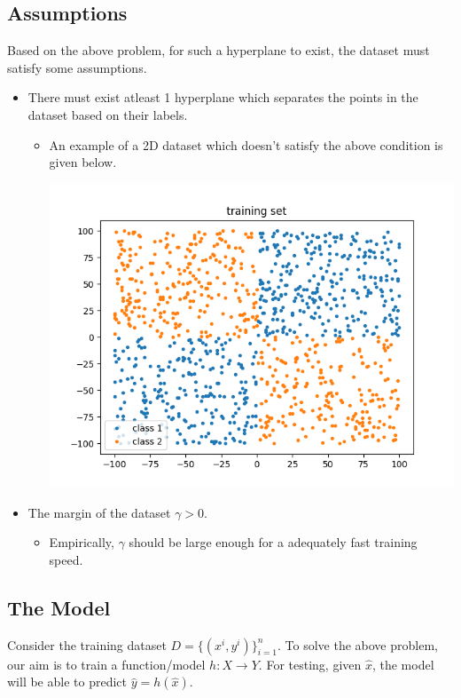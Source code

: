 \documentclass{report}
\begin{document}
\subsection{Assumptions}
Based on the above problem, for such a hyperplane to exist, the dataset must satisfy some assumptions.
\begin{itemize}
  \item There must exist atleast 1 hyperplane which separates the points in the dataset based on their labels.
        \begin{itemize}
          \item An example of a 2D dataset which doesn't satisfy the above condition is given below.
                \begin{center}
                  \includegraphics[scale=0.2]{"images/perc-02.png"}
                \end{center}
        \end{itemize}
  \item The margin of the dataset $\gamma > 0$.
        \begin{itemize}
          \item Empirically, $\gamma$ should be large enough for a adequately fast training speed.
        \end{itemize}
\end{itemize}

\subsection{The Model}
Consider the training dataset $D = \{(x^i,y^i)\}_{i=1}^n$.
To solve the above problem, our aim is to train a function/model $h: X \rightarrow Y$. For testing, given $\hat{x}$, the model will be able to predict $\hat{y} = h(\hat{x})$. \\
\end{document}
